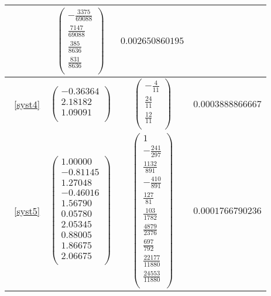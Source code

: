 \documentclass{report}
\begin{document}
\begin{tabular}{|c|c|c|c|}
          &
          $\begin{pmatrix}
              -\frac{3375}{69088} \\
              \frac{7147}{69088} \\
              \frac{385}{8636} \\
              \frac{831}{8636} \\
          \end{pmatrix}$         
           &
           $0.002650860195$ \\
          \hline
          ~\eqref{syst4}
          &
          $\begin{pmatrix}
              -0.36364 \\
              2.18182 \\
              1.09091 \\
           \end{pmatrix}$
          &
          $\begin{pmatrix}
              -\frac{4}{11} \\
              \frac{24}{11} \\
              \frac{12}{11} \\
          \end{pmatrix}$
          &
          $0.0003888866667$ \\
          \hline
          ~\eqref{syst5}
          &
          $\begin{pmatrix}
              1.00000 \\
              -0.81145 \\
              1.27048 \\
              -0.46016 \\
              1.56790 \\
              0.05780 \\
              2.05345 \\
              0.88005 \\
              1.86675 \\
              2.06675 \\
           \end{pmatrix}$
          &
          $\begin{pmatrix}
              1 \\
              -\frac{241}{297} \\
              \frac{1132}{891} \\
              -\frac{410}{891} \\
              \frac{127}{81} \\
              \frac{103}{1782} \\
              \frac{4879}{2376} \\
              
              \frac{697}{792} \\
              \frac{22177}{11880} \\
              \frac{24553}{11880} \\
          \end{pmatrix}$
          &
          $0.0001766790236$ \\
	    \hline

         \end{tabular}
\end{document}
